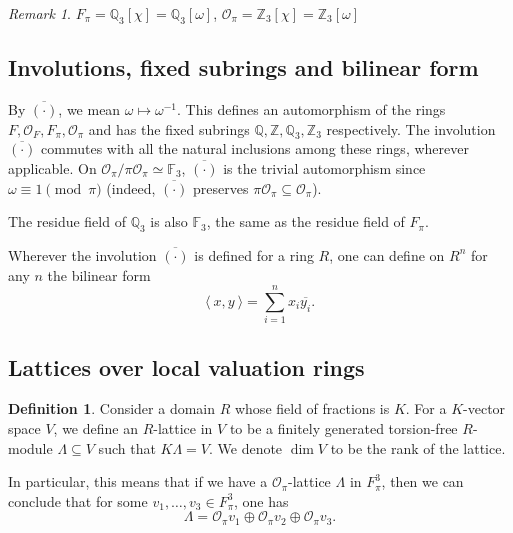 \documentclass{eptcs}
\theoremstyle{remark}
\newtheorem{remark}[theorem]{Remark}
\theoremstyle{definition}
\newtheorem{definition}[theorem]{Definition}
\begin{document}
\begin{remark}
 $F_{\pi} = \mathbb{Q}_3[\chi] = \mathbb{Q}_3[\omega]$, $\mathcal{O}_{\pi} = \mathbb{Z}_3[\chi] = \mathbb{Z}_3[\omega]$
\end{remark}
\subsection{Involutions, fixed subrings and bilinear form}



By $\overline{(\cdot)}$, we mean $\omega \mapsto \omega^{-1}$. This defines an automorphism of the rings $F,\mathcal{O}_F, F_{\pi}, \mathcal{O}_{\pi}$ and has the fixed subrings $\mathbb{Q},\mathbb{Z}, \mathbb{Q}_3, \mathbb{Z}_3$ respectively. The involution $\overline{(\cdot)}$ commutes with all the natural inclusions among these rings, wherever applicable. On $\mathcal{O}_{\pi}/\pi \mathcal{O}_{\pi} \simeq \mathbb{F}_3$, $\overline{(\cdot)}$ is the trivial automorphism since $\omega \equiv 1 \pmod{\pi}$ (indeed, $\overline{(\cdot)}$ preserves $\pi \mathcal{O}_{\pi} \subseteq \mathcal{O}_{\pi}$).

The residue field of $\mathbb{Q}_{3}$ is also $\mathbb{F}_{3}$, the same as the residue field of $F_\pi$. 

Wherever the involution $\overline{(\cdot)}$ is defined for a ring $R$, one can define on $R^n$ for any $n$ the bilinear form
\begin{equation}
    \langle\ x,y \ \rangle
 = \sum_{i=1}^n x_i \overline{y_i}.\end{equation}


\subsection{Lattices over local valuation rings}


\begin{definition}
Consider a domain $R$ whose field of fractions is $K$. For a $K$-vector space $V$, 
we define an $R$-lattice in $V$ to be a finitely generated torsion-free $R$-module $\Lambda \subseteq V$ such that $K \Lambda = V$. We denote $\dim V$ to be the rank of the lattice.
\end{definition}

In particular, this means that if we have a $\mathcal{O}_\pi$-lattice $\Lambda$ in $F_{\pi}^3$, then we can conclude that for some $v_1,\dots,v_3 \in F_{\pi}^{3}$, one has
\begin{equation}
  \Lambda = \mathcal{O}_{\pi} v_1 \oplus \mathcal{O}_{\pi} v_{2} \oplus \mathcal{O}_{\pi} v_3.
\end{equation}
\end{document}
